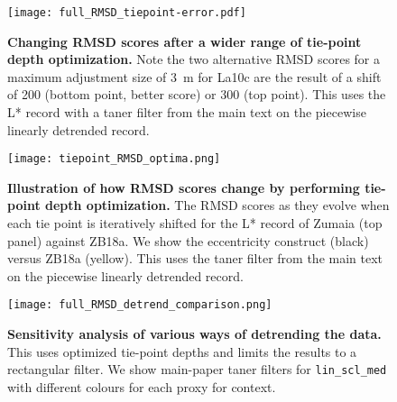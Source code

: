 \documentclass[draft]{agujournal2019}
\begin{document}
\begin{figure}[htb]
  \centering \texttt{[image: full\_RMSD\_tiepoint-error.pdf]}
  \caption{\label{fig:full-RMSD-tie-error}
    \textbf{Changing RMSD scores after a wider range of tie-point depth optimization.}
    Note the two alternative \gls{RMSD} scores for a maximum adjustment size of \qty{3}{\metre} for La10c are the result of a shift of \qty{200}{\kiloyear} (bottom point, better score) or \qty{300}{\kiloyear} (top point).
    This uses the \gls{L*} record with a taner filter from the main text on the piecewise linearly detrended record.
    }
\end{figure}

\begin{figure}[htb]
  \centering \texttt{[image: tiepoint\_RMSD\_optima.png]}
  \caption{\label{fig:tiepoint-RMSD-optima}
    \textbf{Illustration of how RMSD scores change by performing tie-point depth optimization.}
    The \gls{RMSD} scores as they evolve when each tie point is iteratively shifted for the \gls{L*} record of Zumaia (top panel) against ZB18a.
    We show the eccentricity construct (black) versus ZB18a (yellow).
    This uses the taner filter from the main text on the piecewise linearly detrended record.
    }
\end{figure}


\begin{figure}[htb]
  \centering \texttt{[image: full\_RMSD\_detrend\_comparison.png]}
  \caption{\label{fig:full-RMSD-detrend}
    \textbf{Sensitivity analysis of various ways of detrending the data.}
    This uses optimized tie-point depths and limits the results to a rectangular filter.
    We show main-paper taner filters for \texttt{lin\_scl\_med} with different colours for each proxy for context.
    }
\end{figure}
\end{document}

